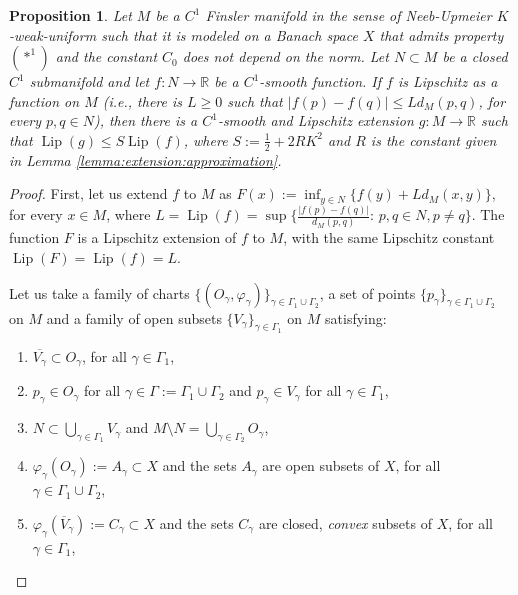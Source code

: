 \documentclass[11pt]{amsart}
\newtheorem{prop}[thm]{Proposition}
\numberwithin{equation}{section}
\begin{document}
\begin{prop}\label{ext}
Let $M$ be a $C^1$ Finsler manifold  in the sense of Neeb-Upmeier $K$-weak-uniform such that it is  modeled on a Banach space $X$ that admits property $(*^1)$ and the constant $C_0$ does not depend on the norm.
Let $N\subset M$ be a closed $C^1$ submanifold and let  $f:N\to\mathbb{R}$ be a $C^1$-smooth function. If $f$ is Lipschitz  as a function on $M$ (i.e., there is $L\ge 0$ such that $|f(p)-f(q)|\le Ld_M(p,q)$, for every $p,q\in N$), then there is a $C^1$-smooth and Lipschitz extension $g:M\to{\mathbb{R}}$ such that ${\operatorname{Lip}}(g)\leq S {\operatorname{Lip}}(f)$, where $S:=\frac{1}{2}+2RK^2$ and $R$ is the constant given in Lemma \ref{lemma:extension:approximation}.
\end{prop}
\begin{proof}
First, let us extend $f$ to $M$ as  $F(x):=\inf_{y\in N} \{f(y)+Ld_M(x,y)\}$, for every $x\in M$, where $L={\operatorname{Lip}}(f)=
\sup\{\frac{|f(p)-f(q)|}{d_M(p,q)}:\, p,q\in N, p\not=q\}$. The function $F$ is a Lipschitz extension of $f$ to $M$, with the same Lipschitz constant  ${\operatorname{Lip}}(F)={\operatorname{Lip}}(f)=L$.

Let us take a family of charts  $\{(O_\gamma,\varphi_\gamma)\}_{\gamma\in \Gamma_1\cup \Gamma_2}$, a set of points $\{p_\gamma\}_{\gamma \in \Gamma_1\cup \Gamma_2}$ on $M$  and a family of open subsets $\{V_\gamma\}_{\gamma \in \Gamma_1}$ on $M$ satisfying:
\begin{enumerate}
\item $\overline{V_\gamma}\subset O_\gamma$, for all $\gamma \in \Gamma_1$,
\item $p_\gamma \in O_{\gamma}$ for all $\gamma \in \Gamma:=\Gamma_1 \cup \Gamma_2$ and $p_\gamma \in V_\gamma$ for all $\gamma\in \Gamma_1$,
\item  $N\subset \bigcup_{\gamma \in \Gamma_1} V_\gamma$ and
$M\setminus N=\bigcup_{\gamma \in \Gamma_2} O_\gamma $,
\item $\varphi_\gamma(O_\gamma):=A_\gamma\subset X$ and the sets $A_\gamma$ are open  subsets of $X$, for all $\gamma \in \Gamma_1 \cup \Gamma_2$,
\item  $\varphi_\gamma(\overline{V}_\gamma):=C_\gamma\subset X$ and the sets  $C_\gamma$ are  closed, {\em convex} subsets of $X$, for all $\gamma \in \Gamma_1$,
 

\end{enumerate}
\end{proof}
\end{document}
